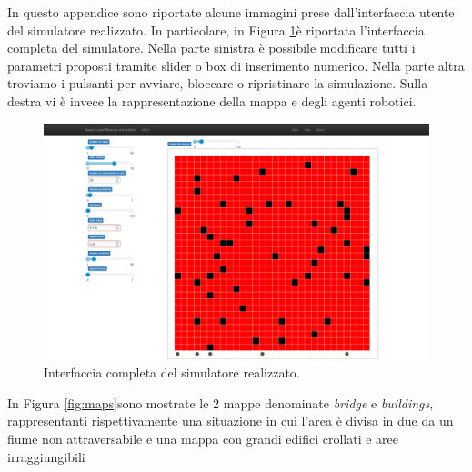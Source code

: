 In questo appendice sono riportate alcune immagini prese dall'interfaccia utente del simulatore realizzato. In particolare, in Figura \ref{fig:interface}è riportata l'interfaccia completa del simulatore. Nella parte sinistra è possibile modificare tutti i parametri proposti tramite slider o box di inserimento numerico. Nella parte altra troviamo i pulsanti per avviare, bloccare o ripristinare la simulazione. Sulla destra vi è invece la rappresentazione della mappa e degli agenti robotici.
\begin{figure}
	\centering
	\includegraphics[width=1.2\linewidth]{images/interface}
	\caption{Interfaccia completa del simulatore realizzato.}
	\label{fig:interface}
\end{figure}
In Figura \ref{fig:maps}sono mostrate le 2 mappe denominate \textit{bridge} e \textit{buildings}, rappresentanti rispettivamente una situazione in cui l'area è divisa in due da un fiume non attraversabile e una mappa con grandi edifici crollati e aree irraggiungibili
